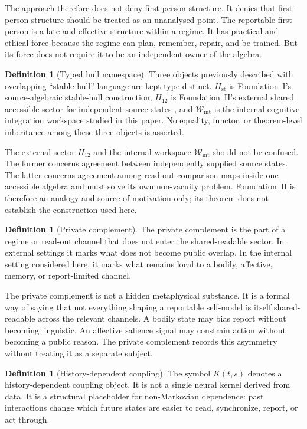 \documentclass[12pt]{article}
\theoremstyle{definition}
\newtheorem{definition}[proposition]{Definition}
\theoremstyle{remark}
\newcommand{\Wint}{\mathcal W_{\mathrm{int}}}
\begin{document}
The approach therefore does not deny first-person structure. It denies
that first-person structure should be treated as an unanalysed point.
The reportable first person is a late and effective structure within a
regime. It has practical and ethical force because the regime can plan,
remember, repair, and be trained. But its force does not require it to
be an independent owner of the algebra.

\begin{definition}[Typed hull namespace]
Three objects previously described with overlapping ``stable hull''
language are kept type-distinct. \(H_{\mathrm{st}}\) is Foundation~I's
source-algebraic stable-hull construction, \(H_{12}\) is Foundation~II's
external shared accessible sector for independent source states
\cite{FoundationII}, and \(\Wint\) is the internal cognitive integration
workspace studied in this paper. No equality, functor, or theorem-level
inheritance among these three objects is asserted.
\end{definition}

The external sector \(H_{12}\) and the internal workspace \(\Wint\)
should not be confused. The former concerns agreement between
independently supplied source states. The latter concerns agreement
among read-out comparison maps inside one accessible algebra and must
solve its own non-vacuity problem. Foundation~II is therefore an analogy
and source of motivation only; its theorem does not establish the
construction used here.

\begin{definition}[Private complement]
The private complement is the part of a regime or read-out channel that
does not enter the shared-readable sector. In external settings it marks
what does not become public overlap. In the internal setting considered
here, it marks what remains local to a bodily, affective, memory, or
report-limited channel.
\end{definition}

The private complement is not a hidden metaphysical substance. It is a
formal way of saying that not everything shaping a reportable self-model
is itself shared-readable across the relevant channels. A bodily state
may bias report without becoming linguistic. An affective salience
signal may constrain action without becoming a public reason. The
private complement records this asymmetry without treating it as a
separate subject.

\begin{definition}[History-dependent coupling]
The symbol \(K(t,s)\) denotes a history-dependent coupling object. It is
not a single neural kernel derived from data. It is a structural
placeholder for non-Markovian dependence: past interactions change which
future states are easier to read, synchronize, report, or act through.
\end{definition}
\end{document}
